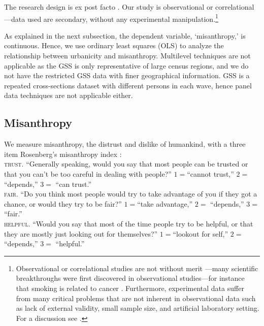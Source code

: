 \documentclass[11pt, letterpaper]{article}
\begin{document}
\begin{spacing}{1.4}
The research design is ex post facto \citep{mohr95}. Our study is observational or correlational---data used are secondary, without any experimental manipulation.\footnote{Observational or correlational studies are not
without merit%
---many scientific breakthroughs were first
discovered in observational studies---for instance that smoking is
related to cancer \citep[e.g.,][]{blanchflower11,oswald14}.
 Furthermore, experimental data %
 suffer from many critical problems that are not inherent in
observational data such as lack of external validity, small sample size, and  
artificial laboratory setting. %
For a discussion see \citet{pawson97}.}

As explained in the next subsection, the dependent variable, `misanthropy,' is
continuous. Hence, we  use ordinary least squares (OLS) to analyze the
relationship between urbanicity and  misanthropy.
Multilevel techniques are not applicable  as the GSS is only representative of
large census regions, and we do not have the restricted GSS data with finer
geographical information.
 GSS is a repeated cross-sections dataset with different persons in each wave, hence
 panel data techniques are not applicable either. 

\subsection*{Misanthropy}

We measure misanthropy, the distrust and dislike of humankind, with a three item  Rosenberg's  misanthropy index \citep{rosenberg56,smith97}:\\

\indent\textsc{trust}. ``Generally speaking, would you say that most people can be trusted or that you can't be too
careful in dealing with people?''  $1=$``cannot trust,'' $2=$     ``depends,'' $3=$   ``can trust.''\\
\indent\textsc{fair}. ``Do you think most people would try to take advantage of you if they got a chance, or
would they try to be fair?'' $1=$``take advantage,'' $2=$       ``depends,'' $3=$          ``fair.'' \\
\indent\textsc{helpful}. ``Would you say that most of the time people try to be helpful, or that they are mostly just
looking out for themselves?'' $1=$``lookout for self,'' $2=$       ``depends,'' $3=$        ``helpful.''\\ 


\end{spacing}
\end{document}
